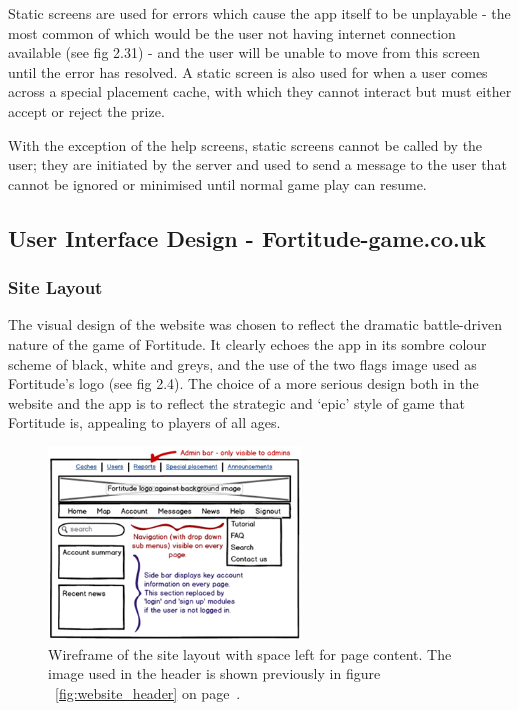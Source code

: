 Static screens are used for errors which cause the app itself to be unplayable - the most common of which would be the user not having internet connection available (see fig 2.31) - and the user will be unable to move from this screen until the error has resolved. A static screen is also used for when a user comes across a special placement cache, with which they cannot interact but must either accept or reject the prize.

With the exception of the help screens, static screens cannot be called by the user; they are initiated by the server and used to send a message to the user that cannot be ignored or minimised until normal game play can resume.

\subsection{User Interface Design - Fortitude-game.co.uk}

\subsubsection{Site Layout}

The visual design of the website was chosen to reflect the dramatic battle-driven nature of the game of Fortitude. It clearly echoes the app in its sombre colour scheme of black, white and greys, and the use of the two flags image used as Fortitude's logo (see fig 2.4). The choice of a more serious design both in the website and the app is to reflect the strategic and `epic' style of game that Fortitude is, appealing to players of all ages.

\begin{figure}
	\vspace{-30pt}
	\begin{center}
	\includegraphics[width=0.6\textwidth]{images/website_wireframe}
	\caption{Wireframe of the site layout with space left for page content. The image used in the header is shown previously in figure ~\ref{fig:website_header} on page~\pageref{fig:website_header}.}
	\label{website_wireframe}
	\end{center}
	\vspace{-20pt}
\end{figure}

